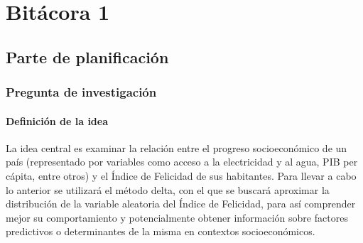 \chapter{Bitácora 1} \label{bitacora1}

\section{Parte de planificación} 
\subsection{Pregunta de investigación}

\subsubsection{Definición de la idea} 

La idea central es examinar la relación entre el progreso socioeconómico de un país (representado por variables como acceso a la electricidad y al agua, PIB per cápita, entre otros) y el Índice de Felicidad de sus habitantes. Para llevar a cabo lo anterior se utilizará el método delta, con el que se buscará aproximar la distribución de la variable aleatoria del Índice de Felicidad, para así comprender mejor su comportamiento y potencialmente obtener información sobre factores predictivos o determinantes de la misma en contextos socioeconómicos. 

